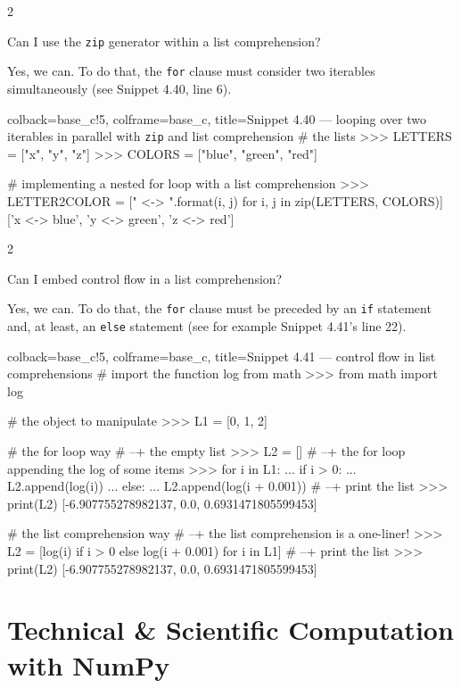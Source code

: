 \documentclass[a4paper,11pt]{book}
\newcommand{\question}[1]{%
    \begin{tcolorbox}[colback=comp_c!10,colframe=comp_c,sidebyside align=top,width=\linewidth,before skip=1ex]
        #1
    \end{tcolorbox}
    \switchcolumn%
}
\newcommand{\note}[1]{%
    \begin{tcolorbox}[colback=white!0,colframe=white!10,width=\linewidth,before skip=1ex]
        #1
    \end{tcolorbox}
}
\begin{document}
\begin{paracol}{2}
	\question{\raggedright Can I use the \texttt{zip} generator within a list comprehension?}
	\note{Yes, we can. To do that, the \texttt{for} clause must consider two iterables simultaneously (see Snippet 4.40, line 6).}
\end{paracol}
\clearpage

\begin{pythoncode}[linenos=true,]{colback=base_c!5, colframe=base_c, title=\sffamily Snippet 4.40 ---  looping over two iterables in parallel with \texttt{zip} and list comprehension}
# the lists 
>>> LETTERS = ["x", "y", "z"]
>>> COLORS = ["blue", "green", "red"]

# implementing a nested for loop with a list comprehension
>>> LETTER2COLOR = ["{} <-> {}".format(i, j) for i, j in zip(LETTERS, COLORS)]
['x <-> blue', 'y <-> green', 'z <-> red']
\end{pythoncode}

\begin{paracol}{2}
	\question{\raggedright Can I embed control flow in a list comprehension?}
	\note{Yes, we can. To do that, the \texttt{for} clause must be preceded by an \texttt{if} statement and, at least, an \texttt{else} statement (see for example Snippet 4.41's line 22). }
\end{paracol}

\begin{pythoncode}[linenos=true,]{colback=base_c!5, colframe=base_c, title=\sffamily Snippet 4.41 --- control flow in list comprehensions}
# import the function log from math 
>>> from math import log

# the object to manipulate
>>> L1 = [0, 1, 2]

# the for loop way
# --+ the empty list 
>>> L2 = []
# --+ the for loop appending the log of some items
>>> for i in L1:
...     if i > 0:
...         L2.append(log(i))
...     else:
...         L2.append(log(i + 0.001))
# --+ print the list
>>> print(L2)
[-6.907755278982137, 0.0, 0.6931471805599453]

# the list comprehension way
# --+ the list comprehension is a one-liner!
>>> L2 = [log(i) if i > 0 else log(i + 0.001) for i in L1]
# --+ print the list
>>> print(L2)
[-6.907755278982137, 0.0, 0.6931471805599453]
\end{pythoncode}

\theendnotes

\chapter{Technical \& Scientific Computation with NumPy}
\label{ch:tech_sci_computation}
\end{document}
